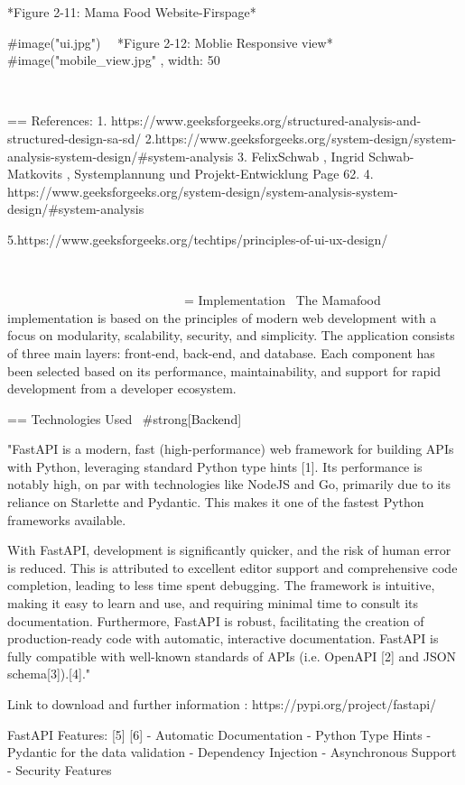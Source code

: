 *Figure 2-11: Mama Food Website-Firspage*

#image("ui.jpg")
\
\
*Figure 2-12: Moblie Responsive view*
#image("mobile_view.jpg" , width: 50%



\

== References: 
1. https://www.geeksforgeeks.org/structured-analysis-and-structured-design-sa-sd/
2.https://www.geeksforgeeks.org/system-design/system-analysis-system-design/#system-analysis
3. FelixSchwab , Ingrid Schwab-Matkovits , Systemplannung und Projekt-Entwicklung Page 62.
4. https://www.geeksforgeeks.org/system-design/system-analysis-system-design/#system-analysis

5.https://www.geeksforgeeks.org/techtips/principles-of-ui-ux-design/

\

\
\
\
\
\
\
\
\
\
\
\
\
\
\
\
\
\
\
\
\
\
\
\
\
\
\
\
\
= Implementation
\
The Mamafood implementation is based on the principles of modern web development with a focus on modularity, scalability, security, and simplicity. The application consists of three main layers: front-end, back-end, and database. Each component has been selected based on its performance, maintainability, and support for rapid development from a developer ecosystem.

== Technologies Used
\
#strong[Backend]

"FastAPI is a modern, fast (high-performance) web framework for building APIs with Python, leveraging standard Python type hints [1]. Its performance is notably high, on par with technologies like NodeJS and Go, primarily due to its reliance on Starlette and Pydantic. This makes it one of the fastest Python frameworks available.

With FastAPI, development is significantly quicker, and the risk of human error is reduced. This is attributed to excellent editor support and comprehensive code completion, leading to less time spent debugging. The framework is intuitive, making it easy to learn and use, and requiring minimal time to consult its documentation. Furthermore, FastAPI is robust, facilitating the creation of production-ready code with automatic, interactive documentation. FastAPI is fully compatible with well-known standards of APIs (i.e. OpenAPI [2] and JSON schema[3]).[4]." 

Link to download and further information : https://pypi.org/project/fastapi/



FastAPI Features: [5] [6]
- Automatic Documentation
- Python Type Hints
- Pydantic for the data validation
- Dependency Injection
- Asynchronous Support
- Security Features

